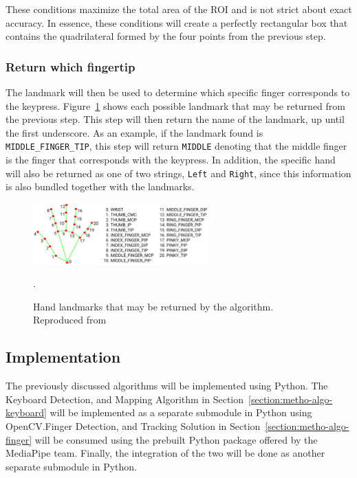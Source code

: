 \documentclass{report}
\begin{document}
These conditions maximize the total area of the ROI and is not strict about
exact accuracy. In essence, these conditions will create a perfectly rectangular
box that contains the quadrilateral formed by the four points from the previous
step.

\subsubsection{Return which fingertip}
The landmark will then be used to determine which specific finger corresponds to
the keypress. Figure~\ref{fig:metho-algo-integration-landmarks} shows each
possible landmark that may be returned from the previous step. This step will
then return the name of the landmark, up until the first underscore. As an
example, if the landmark found is \texttt{MIDDLE\_FINGER\_TIP}, this step will
return \texttt{MIDDLE} denoting that the middle finger is the finger that
corresponds with the keypress. In addition, the specific hand will also be
returned as one of two strings, \texttt{Left} and \texttt{Right}, since
this information is also bundled together with the landmarks.

\begin{figure}[H]
	\centering
	\includegraphics[width=0.6\textwidth]{hand-landmarks.png}
	\caption{Hand landmarks that may be returned by the algorithm. Reproduced from }.
	\label{fig:metho-algo-integration-landmarks}
	\centering
\end{figure}

\subsection{Implementation}
\label{section:metho-algo-implementation}
The previously discussed algorithms will be implemented using Python. The
Keyboard Detection, and Mapping Algorithm in
Section~\ref{section:metho-algo-keyboard} will be implemented as a separate
submodule in Python using OpenCV.\@The Finger Detection, and Tracking Solution
in Section~\ref{section:metho-algo-finger} will be consumed using the prebuilt
Python package offered by the MediaPipe team. Finally, the integration of the
two will be done as another separate submodule in Python.
\end{document}
